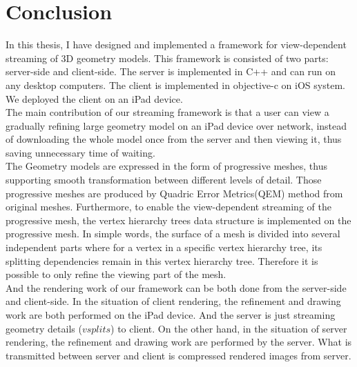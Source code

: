 \chapter{Conclusion}
\label{chapter:Conclusion}
In this thesis, I have designed and implemented a framework for view-dependent streaming of 3D geometry models. This framework is consisted of two parts: server-side and client-side. The server is implemented in C++ and can run on any desktop computers. The client is implemented in objective-c on iOS system. We deployed the client on an iPad device. \\

The main contribution of our streaming framework is that a user can view a gradually refining large geometry model on an iPad device over network, instead of downloading the whole model once from the server and then viewing it, thus saving unnecessary time of waiting. \\

The Geometry models are expressed in the form of progressive meshes, thus supporting smooth transformation between different levels of detail. Those progressive meshes are produced by Quadric Error Metrics(QEM) method from original meshes. Furthermore, to enable the view-dependent streaming of the progressive mesh, the vertex hierarchy trees data structure is implemented on the progressive mesh. In simple words, the surface of a mesh is divided into several independent parts where for a vertex in a specific vertex hierarchy tree, its splitting dependencies remain in this vertex hierarchy tree. Therefore it is possible to only refine the viewing part of the mesh. \\

And the rendering work of our framework can be both done from the server-side and client-side. In the situation of client rendering, the refinement and drawing work are both performed on the iPad device. And the server is just streaming geometry details ($vsplits$) to client. On the other hand, in the situation of server rendering, the refinement and drawing work are performed by the server. What is transmitted between server and client is compressed rendered images from server. \\

